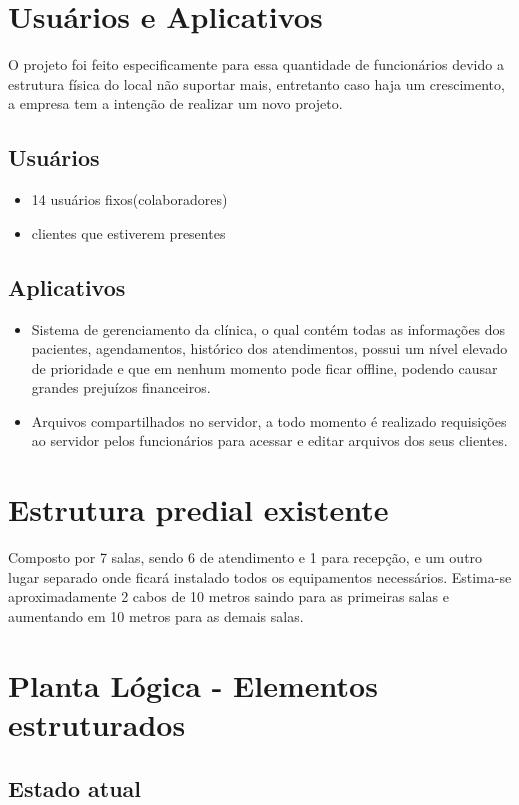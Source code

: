 \documentclass[	DIV=calc,%
							paper=a4,%
							fontsize=12pt,%
							onecolumn]{scrartcl}	 					%
\begin{document}
\section{Usuários e Aplicativos}
O projeto foi feito especificamente para essa quantidade de funcionários devido a estrutura física do local não suportar mais, entretanto caso haja um crescimento, a empresa tem a intenção de realizar um novo projeto.
 

\subsection{Usuários}
\begin{itemize}
	\item 14 usuários fixos(colaboradores)
	\item clientes que estiverem presentes
\end{itemize}

\subsection{Aplicativos}
\begin{itemize}
	\item Sistema de gerenciamento da clínica, o qual contém todas as informações dos pacientes, agendamentos, histórico dos atendimentos, possui um nível elevado de prioridade e que em nenhum momento pode ficar offline, podendo causar grandes prejuízos financeiros.
	\item Arquivos compartilhados no servidor, a todo momento é realizado requisições ao servidor pelos funcionários para acessar e editar arquivos dos seus clientes.
\end{itemize}


\section{Estrutura predial existente}

Composto por 7 salas, sendo 6 de atendimento e 1 para recepção, e um outro lugar separado onde ficará instalado todos os equipamentos necessários. Estima-se aproximadamente 2 cabos de 10 metros saindo para as primeiras salas e aumentando em 10 metros para as demais salas.

\section{Planta Lógica - Elementos estruturados}

\subsection{Estado atual}
\end{document}
